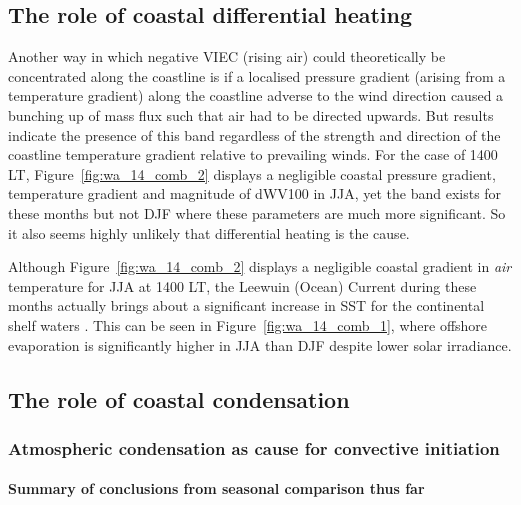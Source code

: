 \subsection{The role of coastal differential heating}

Another way in which negative \ac{VIEC} (rising air) could theoretically be concentrated along the coastline is if a localised pressure gradient (arising from a temperature gradient) along the coastline adverse to the wind direction caused a bunching up of mass flux such that air had to be directed upwards. But results indicate the presence of this band regardless of the strength and direction of the coastline temperature gradient relative to prevailing winds. For the case of 1400 \ac{LT}, Figure~\ref{fig:wa_14_comb_2} displays a negligible coastal pressure gradient, temperature gradient and magnitude of \ac{dWV100} in \ac{JJA}, yet the band exists for these months but not \ac{DJF} where these parameters are much more significant. So it also seems highly unlikely that differential heating is the cause.

Although Figure~\ref{fig:wa_14_comb_2} displays a negligible coastal gradient in \textit{air} temperature for \ac{JJA} at 1400 \ac{LT}, the Leewuin (Ocean) Current during these months actually brings about a significant increase in \ac{SST} for the continental shelf waters \citep{berthot1997}. This can be seen in Figure~\ref{fig:wa_14_comb_1}, where offshore evaporation is significantly higher in \ac{JJA} than \ac{DJF} despite lower solar irradiance.

\subsection{The role of coastal condensation}
\label{ssec:coastal_cond}

\subsubsection{Atmospheric condensation as cause for convective initiation}

\paragraph{Summary of conclusions from seasonal comparison thus far}

